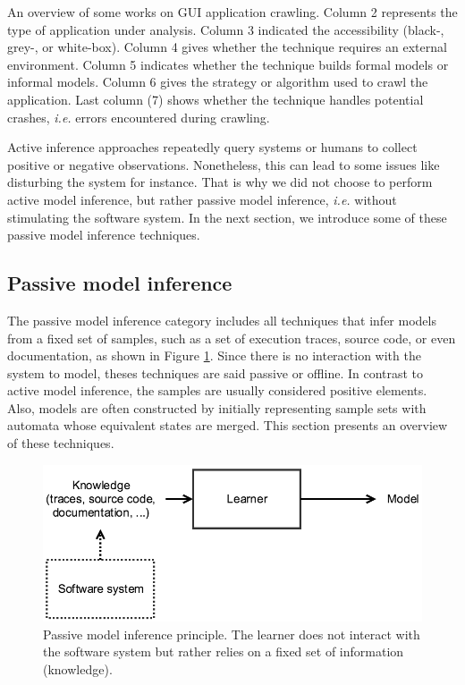 \begin{table}
    \caption{An overview of some works on GUI application
    crawling. Column 2 represents the type of application under
    analysis. Column 3 indicated the accessibility (black-,
    grey-, or white-box). Column 4 gives whether the technique
    requires an external environment. Column 5 indicates whether
    the technique builds formal models or informal models. Column
    6 gives the strategy or algorithm used to crawl the
    application. Last column (7) shows whether the technique
    handles potential crashes, \emph{i.e.} errors encountered
    during crawling.}
	\label{table:gui_works}
\end{table}

Active inference approaches repeatedly query systems or humans to
collect positive or negative observations. Nonetheless, this can
lead to some issues like disturbing the system for instance.
That is why we did not choose to perform active model inference,
but rather passive model inference, \emph{i.e.} without
stimulating the software system. In the next section, we
introduce some of these passive model inference techniques.


\subsection{Passive model inference}
\label{sec:passive}

The passive model inference category includes all techniques that
infer models from a fixed set of samples, such as a set of
execution traces, source code, or even documentation, as shown in
Figure \ref{fig:passive}. Since there is no interaction with the
system to model, theses techniques are said passive or offline.
In contrast to active model inference, the samples are usually
considered positive elements. Also, models are often
constructed by initially representing sample sets with automata
whose equivalent states are merged. This section presents an
overview of these techniques.

\begin{figure}[ht]
    \begin{center}
        \includegraphics[width=1.0\linewidth]{figures/passive.png}
    \end{center}

    \caption{Passive model inference principle. The learner does
    not interact with the software system but rather relies on
    a fixed set of information (knowledge).}
    \label{fig:passive}
\end{figure}


